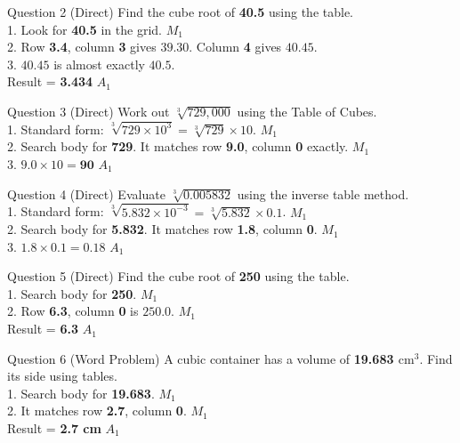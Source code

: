 \documentclass[12pt, a4paper, oneside]{article}
\begin{document}
\begin{solvingbox}{Question 2 (Direct)}
Find the cube root of \textbf{40.5} using the table. \\
1. Look for \textbf{40.5} in the grid. \hfill $M_1$ \\
2. Row \textbf{3.4}, column \textbf{3} gives $39.30$. Column \textbf{4} gives $40.45$. \\
3. $40.45$ is almost exactly $40.5$. \\
Result = \textbf{3.434} \hfill $A_1$
\end{solvingbox}

\begin{solvingbox}{Question 3 (Direct)}
Work out $\sqrt[3]{729,000}$ using the Table of Cubes. \\
1. Standard form: $\sqrt[3]{729 \times 10^3} = \sqrt[3]{729} \times 10$. \hfill $M_1$ \\
2. Search body for \textbf{729}. It matches row \textbf{9.0}, column \textbf{0} exactly. \hfill $M_1$ \\
3. $9.0 \times 10 = \mathbf{90}$ \hfill $A_1$
\end{solvingbox}

\begin{solvingbox}{Question 4 (Direct)}
Evaluate $\sqrt[3]{0.005832}$ using the inverse table method. \\
1. Standard form: $\sqrt[3]{5.832 \times 10^{-3}} = \sqrt[3]{5.832} \times 0.1$. \hfill $M_1$ \\
2. Search body for \textbf{5.832}. It matches row \textbf{1.8}, column \textbf{0}. \hfill $M_1$ \\
3. $1.8 \times 0.1 = \mathbf{0.18}$ \hfill $A_1$
\end{solvingbox}

\begin{solvingbox}{Question 5 (Direct)}
Find the cube root of \textbf{250} using the table. \\
1. Search body for \textbf{250}. \hfill $M_1$ \\
2. Row \textbf{6.3}, column \textbf{0} is $250.0$. \hfill $M_1$ \\
Result = \textbf{6.3} \hfill $A_1$
\end{solvingbox}

\begin{solvingbox}{Question 6 (Word Problem)}
A cubic container has a volume of \textbf{19.683 $\text{cm}^3$}. Find its side using tables. \\
1. Search body for \textbf{19.683}. \hfill $M_1$ \\
2. It matches row \textbf{2.7}, column \textbf{0}. \hfill $M_1$ \\
Result = \textbf{2.7 cm} \hfill $A_1$
\end{solvingbox}
\end{document}
